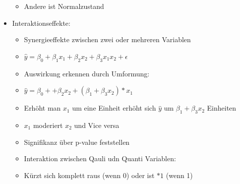 \documentclass[a4paper]{article}
\begin{document}
\begin{landscape}
\begin{multicols}{3}
\begin{itemize}[noitemsep,nolistsep,leftmargin=*]
\begin{itemize}[noitemsep,nolistsep,leftmargin=*]
                \item Andere ist Normalzustand
            \end{itemize}
            \item Interaktionseffekte:
            \begin{itemize}[noitemsep,nolistsep,leftmargin=*]
                \item Synergieeffekte zwischen zwei oder mehreren Variablen
                \item $\hat{y}=\beta_0+\beta_1x_1+\beta_2x_2+\beta_3x_1x_2+\epsilon$
                \item Auswirkung erkennen durch Umformung:
                \item $\hat{y}=\beta_0++\beta_2x_2+ (\beta_1+\beta_3x_2)*x_1$
                \item Erhöht man $x_1$ um eine Einheit erhöht sich $\hat{y}$ um $\beta_1+\beta_3x_2$ Einheiten
                \item $x_1$ moderiert $x_2$ und Vice versa
                \item Signifikanz über p-value feststellen
                \item Interaktion zwischen Qauli udn Quanti Variablen:
                \item Kürzt sich komplett raus (wenn 0) oder ist $*1$ (wenn 1)
            \end{itemize}
        \end{itemize}



\end{multicols}
\end{landscape}
\end{document}

